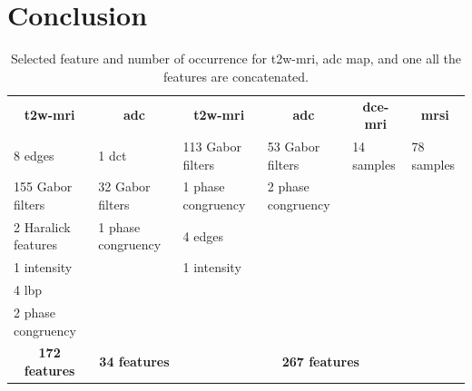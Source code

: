 \documentclass[num-refs]{wiley-article}
\begin{document}
\section{Conclusion}
\label{sec:conclusion}



\begin{table}
  \caption{Selected feature and number of occurrence for \acs*{t2w}-\acs*{mri}, \acs*{adc} map, and one all the features are concatenated.}
  \centering
  \scriptsize
  \begin{tabular}{llllll}
    \toprule
    \multicolumn{1}{c}{\textbf{\acs*{t2w}-\acs*{mri}}} & \multicolumn{1}{c}{\textbf{\acs*{adc}}} & \multicolumn{1}{c}{\textbf{\acs*{t2w}-\acs*{mri}}} & \multicolumn{1}{c}{\textbf{\acs*{adc}}} & \multicolumn{1}{c}{\textbf{\acs*{dce}-\acs*{mri}}} & \multicolumn{1}{c}{\textbf{\acs*{mrsi}}} \\
    \cmidrule(lr){1-1} \cmidrule(lr){2-2} \cmidrule(lr){3-6}
    8 edges & 1 \acs*{dct} & 113 Gabor filters & 53 Gabor filters & 14 samples  & 78 samples \\
    155 Gabor filters & 32 Gabor filters & 1 phase congruency & 2 phase congruency & & \\ 
    2 Haralick features & 1 phase congruency & 4 edges & & & \\
    1 intensity & & 1 intensity & & & \\
    4 \acs*{lbp} & & & & & \\
    2 phase congruency & & & & & \\
    \cmidrule(lr){1-1} \cmidrule(lr){2-2} \cmidrule(lr){3-6}
    \multicolumn{1}{c}{\textbf{172 features}} & \multicolumn{1}{c}{\textbf{34 features}} & \multicolumn{4}{c}{\textbf{267 features}} \\
    \bottomrule
  \end{tabular}
  \label{tab:selfeatocc}
\end{table}
\end{document}
